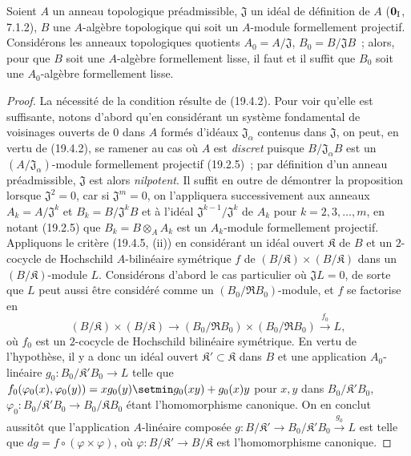 \begin{proposition}[19.4.7]
\label{0.19.4.7-fr}
Soient $A$ un anneau topologique préadmissible, $\mathfrak J$ un idéal de
définition de $A$ \textup{($\mathbf 0_{\rm I}$, 7.1.2)}, $B$ une $A$-algèbre
topologique qui soit un $A$-module formellement projectif. Considérons les
anneaux topologiques quotients $A_0=A/\mathfrak J$,
$B_0=B/\mathfrak JB$~; alors, pour que $B$ soit
une $A$-algèbre formellement
lisse, il faut et il suffit que $B_0$ soit une $A_0$-algèbre formellement
lisse.
\end{proposition}

\begin{proof}
La nécessité de la condition résulte de (19.4.2). Pour voir qu'elle est
suffisante, notons d'abord qu'en considérant un système fondamental de
voisinages ouverts de $0$ dans $A$ formés d'idéaux
$\mathfrak J_\alpha$ contenus dans $\mathfrak J$, on peut, en vertu de
(19.4.2), se ramener au cas où $A$ est \emph{discret} puisque
$B/\mathfrak J_\alpha B$ est un
$(A/\mathfrak J_\alpha)$-module formellement projectif (19.2.5)~; par
définition d'un anneau préadmissible, $\mathfrak J$ est alors
\emph{nilpotent}. Il suffit en outre de démontrer la proposition lorsque
$\mathfrak J^2=0$, car si $\mathfrak J^m=0$, on l'appliquera successivement
aux anneaux $A_k=A/\mathfrak J^k$ et $B_k=B/\mathfrak J^kB$ et à l'idéal
$\mathfrak J^{k-1}/\mathfrak J^k$ de $A_k$ pour $k=2,3,\ldots,m$, en
notant (19.2.5) que $B_k=B\otimes_A A_k$ est un $A_k$-module formellement
projectif. Appliquons le critère (19.4.5, (ii)) en considérant un idéal ouvert
$\mathfrak K$ de $B$ et un $2$-cocycle de Hochschild $A$-bilinéaire
symétrique $f$ de $(B/\mathfrak K)\times(B/\mathfrak K)$ dans un
$(B/\mathfrak K)$-module $L$. Considérons d'abord le cas particulier où
$\mathfrak JL=0$, de sorte que $L$ peut aussi être considéré comme un
$(B_0/\mathfrak RB_0)$-module, et $f$ se factorise en
\[
  (B/\mathfrak K)\times(B/\mathfrak K)\to
  (B_0/\mathfrak RB_0)\times(B_0/\mathfrak RB_0)
  \xrightarrow{f_0}L,
\]
où $f_0$ est un $2$-cocycle de Hochschild bilinéaire symétrique. En vertu de
l'hypothèse, il y a donc un idéal ouvert
$\mathfrak K'\subset\mathfrak K$ dans $B$ et une application
$A_0$-linéaire $g_0:B_0/\mathfrak K'B_0\to L$ telle que
$f_0(\varphi_0(x),\varphi_0(y))
=xg_0(y)\setmin g_0(xy)+g_0(x)y$
pour $x,y$ dans $B_0/\mathfrak K'B_0$, $\varphi_0:B_0/\mathfrak K'B_0\to B_0/\mathfrak KB_0$ étant
l'homomorphisme canonique. On en conclut aussitôt que
l'application $A$-linéaire composée
$g:B/\mathfrak K'\to B_0/\mathfrak K'B_0\xrightarrow{g_0}L$ est telle
que $dg=f\circ(\varphi\times\varphi)$, où
$\varphi:B/\mathfrak K'\to B/\mathfrak K$ est l'homomorphisme
canonique.


\end{proof}
